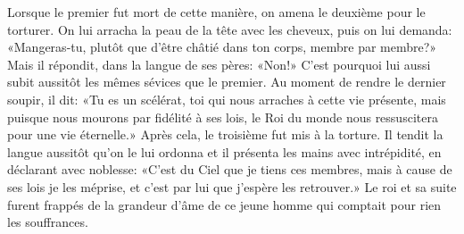 Lorsque le premier fut mort de cette manière, on amena le deuxième pour le torturer.
On lui arracha la peau de la tête avec les cheveux, puis on lui demanda:
	«Mangeras-tu, plutôt que d’être châtié dans ton corps, membre par membre?»
Mais il répondit, dans la langue de ses pères: «Non!»
C’est pourquoi lui aussi subit aussitôt les mêmes sévices que le premier.
Au moment de rendre le dernier soupir, il dit:
	«Tu es un scélérat, toi qui nous arraches à cette vie présente,
	mais puisque nous mourons par fidélité à ses lois,
	le Roi du monde nous ressuscitera pour une vie éternelle.»
Après cela, le troisième fut mis à la torture.
Il tendit la langue aussitôt qu’on le lui ordonna
	et il présenta les mains avec intrépidité,
	en déclarant avec noblesse:
	«C’est du Ciel que je tiens ces membres,
	mais à cause de ses lois je les méprise,
	et c’est par lui que j’espère les retrouver.»
Le roi et sa suite furent frappés de la grandeur d’âme de ce jeune homme
	qui comptait pour rien les souffrances.
